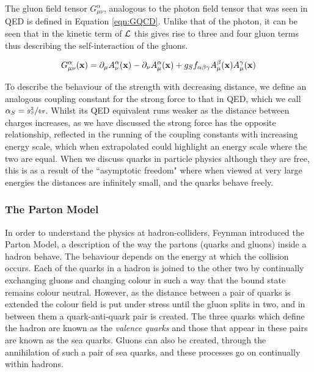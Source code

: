 The gluon field tensor $G^{\alpha}_{\mu \nu}$, analogous to the photon field tensor that was seen in QED is defined in Equation \ref{eqn:GQCD}. Unlike that of the photon, it can be seen that in the kinetic term of ${\mathcal{L}}$ this gives rise to three and four gluon terms thus describing the self-interaction of the gluons. 

\begin{equation}
G^{\alpha}_{\mu \nu} (\mathbf{x}) = \partial_{\mu} A^{\alpha}_{\nu} (\mathbf{x}) - \partial_{\nu}A^{\alpha}_{\mu}(\mathbf{x}) + g_{S} f_{\alpha \beta \gamma} A^{\beta}_{\mu}(\mathbf{x})A^{\gamma}_{\mu}(\mathbf{x})
\label{eqn:GQCD}
\end{equation}



 To describe the behaviour of the strength with decreasing distance, we define an analogous coupling constant for the strong force to that in QED, which we call $\alpha_{S} = \sfrac{g_{S}^{2}}{4\pi}$. Whilst its QED equivalent runs weaker as the distance between charges increases, as we have discussed the strong force has the opposite relationship, reflected in the running of the coupling constants with increasing energy scale, which when extrapolated could highlight an energy scale where the two are equal. When we discuss quarks in particle physics although they are free, this is as a result of the ``asymptotic freedom" where when viewed at very large energies the distances are infinitely small, and the quarks behave freely. 
 
 \subsubsection{The Parton Model}
 
 In order to understand the physics at hadron-colliders, Feynman introduced the Parton Model, a description of the way the partons (quarks and gluons) inside a hadron behave. The behaviour depends on the energy at which the collision occurs. Each of the quarks in a hadron is joined to the other two by continually exchanging gluons and changing colour in such a way that the bound state remains colour neutral. However, as the distance between a pair of quarks is extended the colour field is put under stress until the gluon splits in two, and in between them a quark-anti-quark pair is created. The three quarks which define the hadron are known as the \textit{valence quarks} and those that appear in these pairs are known as the sea quarks. Gluons can also be created, through the annihilation of such a pair of sea quarks, and these processes go on continually within hadrons. 
 
